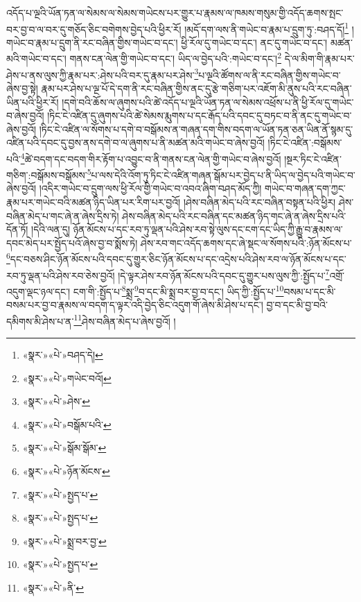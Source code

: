 འདོད་པ་ལྔའི་ཡོན་ཏན་ལ་སེམས་ལ་སེམས་གཡེངས་པར་གྱུར་པ་རྣམས་ལ་ཁམས་གསུམ་གྱི་འདོད་ཆགས་སྤང་བར་བྱ་བ་ལ་བར་དུ་གཅོད་ཅིང་བགེགས་བྱེད་པའི་ཕྱིར་རོ། །མདོ་དག་ལས་ནི་གཡེང་བ་རྣམ་པ་དྲུག་ཏུ་:བཤད་དོ།\footnote{«སྣར་»«པེ་»བཤད་དེ།} །གཡེང་བ་རྣམ་པ་དྲུག་ནི་རང་བཞིན་གྱིས་གཡེང་བ་དང་། ཕྱི་རོལ་དུ་གཡེང་བ་དང་། ནང་དུ་གཡེང་བ་དང་། མཚན་མའི་གཡེང་བ་དང་། གནས་ངན་ལེན་གྱི་གཡེང་བ་དང་། ཡིད་ལ་བྱེད་པའི་:གཡེང་བ་དང་།\footnote{«སྣར་»«པེ་»གཡེང་བའོ།} དེ་ལ་མིག་གི་རྣམ་པར་ཤེས་པ་ནས་ལུས་ཀྱི་རྣམ་པར་:ཤེས་པའི་བར་དུ་རྣམ་པར་ཤེས་\footnote{«སྣར་»«པེ་»ཤེས་}པ་ལྔའི་ཚོགས་ལ་ནི་རང་བཞིན་གྱིས་གཡེང་བ་ཞེས་བྱ་སྟེ། རྣམ་པར་ཤེས་པ་ལྔ་པོ་དེ་དག་ནི་རང་བཞིན་གྱིས་ནང་དུ་རྩེ་གཅིག་པར་འཇོག་མི་ནུས་པའི་རང་བཞིན་ཡིན་པའི་ཕྱིར་རོ། །དགེ་བའི་ཆོས་ལ་ཞུགས་པའི་ཚེ་འདོད་པ་ལྔའི་ཡོན་ཏན་ལ་སེམས་འཕྲོས་པ་ནི་ཕྱི་རོལ་དུ་གཡེང་བ་ཞེས་བྱའོ། །ཏིང་ངེ་འཛིན་དུ་ཞུགས་པའི་ཚེ་སེམས་རྨུགས་པ་དང་རྒོད་པའི་དབང་དུ་བཏང་བ་ནི་ནང་དུ་གཡེང་བ་ཞེས་བྱའོ། །ཏིང་ངེ་འཛིན་ལ་སོགས་པ་དགེ་བ་བསྒོམས་ན་གཞན་དག་གིས་བདག་ལ་ཡོན་ཏན་ཅན་ཡིན་ནོ་སྙམ་དུ་འཛིན་པའི་དབང་དུ་བྱས་ནས་དགེ་བ་ལ་ཞུགས་པ་ནི་མཚན་མའི་གཡེང་བ་ཞེས་བྱའོ། །ཏིང་ངེ་འཛིན་:བསྒོམས་པའི་\footnote{«སྣར་»«པེ་»བསྒོམ་པའི་}ཚེ་བདག་དང་བདག་གིར་རྟོག་པ་འབྱུང་བ་ནི་གནས་ངན་ལེན་གྱི་གཡེང་བ་ཞེས་བྱའོ། །སྔར་ཏིང་ངེ་འཛིན་གཅིག་:བསྒོམས་བསྒོམས་\footnote{«སྣར་»«པེ་»སྒོམ་སྒོམ་}པ་ལས་དེའི་འོག་ཏུ་ཏིང་ངེ་འཛིན་གཞན་སྒོམ་པར་བྱེད་པ་ནི་ཡིད་ལ་བྱེད་པའི་གཡེང་བ་ཞེས་བྱའོ། །འདིར་གཡེང་བ་དྲུག་ལས་ཕྱི་རོལ་གྱི་གཡེང་བ་འབའ་ཞིག་བཤད་མོད་ཀྱི། གཡེང་བ་གཞན་དག་ཀྱང་རྣམ་པར་གཡེང་བའི་མཚན་ཉིད་ཡིན་པར་རིག་པར་བྱའོ། །ཤེས་བཞིན་མེད་པའི་རང་བཞིན་བསྟན་པའི་ཕྱིར། ཤེས་བཞིན་མེད་པ་གང་ཞེ་ན་ཞེས་དྲིས་ཏེ། ཤེས་བཞིན་མེད་པའི་རང་བཞིན་དང་མཚན་ཉིད་གང་ཞེ་ན་ཞེས་དྲིས་པའི་དོན་ཏོ། །དེའི་ལན་དུ། ཉོན་མོངས་པ་དང་རབ་ཏུ་ལྡན་པའི་ཤེས་རབ་སྟེ་ལུས་དང་ངག་དང་ཡིད་ཀྱི་རྒྱུ་བ་རྣམས་ལ་དབང་མེད་པར་སྤྱོད་པའོ་ཞེས་བྱ་བ་སྨོས་ཏེ། ཤེས་རབ་གང་འདོད་ཆགས་དང་ཞེ་སྡང་ལ་སོགས་པའི་:ཉོན་མོངས་པ་\footnote{«སྣར་»«པེ་»ཉོན་མོངས་}དང་བཅས་ཤིང་ཉོན་མོངས་པའི་དབང་དུ་གྱུར་ཅིང་ཉོན་མོངས་པ་དང་འདྲེས་པའི་ཤེས་རབ་ལ་ཉོན་མོངས་པ་དང་རབ་ཏུ་ལྡན་པའི་ཤེས་རབ་ཅེས་བྱའོ། །དེ་ལྟར་ཤེས་རབ་ཉོན་མོངས་པའི་དབང་དུ་གྱུར་པས་ལུས་ཀྱི་:སྤྱོད་པ་\footnote{«སྣར་»«པེ་»སྤྱད་པ་}འགྲོ་འདུག་ལྡང་ཉལ་དང་། ངག་གི་:སྤྱོད་པ་\footnote{«སྣར་»«པེ་»སྤྱད་པ་}སྨྲ་\footnote{«སྣར་»«པེ་»སྨྲ་བར་བྱ་}བ་དང་མི་སྨྲ་བར་བྱ་བ་དང་། ཡིད་ཀྱི་:སྤྱོད་པ་\footnote{«སྣར་»«པེ་»སྤྱད་པ་}བསམ་པ་དང་མི་བསམ་པར་བྱ་བ་རྣམས་ལ་བདག་ད་ལྟར་འདི་བྱེད་ཅིང་འདུག་གོ་ཞེས་མི་ཤེས་པ་དང་། བྱ་བ་དང་མི་བྱ་བའི་དམིགས་མི་ཤེས་པ་ན་\footnote{«སྣར་»«པེ་»ནི་}ཤེས་བཞིན་མེད་པ་ཞེས་བྱའོ། །
